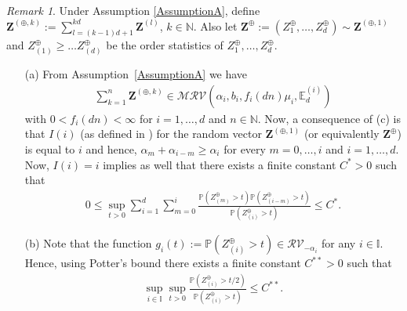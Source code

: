 \documentclass[aos]{imsart}
\numberwithin{equation}{section}
\theoremstyle{plain} %
\theoremstyle{remark}
\newtheorem{remark}[theorem]{Remark}
\newcommand{\beao}{\begin{eqnarray*}}
\newcommand{\eeao}{\end{eqnarray*}\noindent}
\newcommand{\beam}{\begin{eqnarray}}
\newcommand{\eeam}{\end{eqnarray}\noindent}
\newcommand{\E}{\mathbb{E}}
\newcommand{\N}{\mathbb{N}}
\renewcommand\P{\mathbb{P}}
\newcommand{\VF}[1]{{\color{blue} #1}}
\def\MRV{\mathcal{MRV}}
\def\bZ{\boldsymbol Z}
\newcommand{\DAS}[1]{{\color{red} #1}}
\begin{document}
 
\newpage
    
    \begin{remark} \label{Remark 2} %
    Under Assumption \ref{AssumptionA}, define $\bZ^{(\oplus,k)}:=\sum_{l=(k-1)d+1}^{kd}\bZ^{(l)}$, $k\in\N$. Also let $\bZ^{\oplus}:=(Z_{1}^{\oplus},\ldots, Z_{d}^{\oplus}) \sim \bZ^{(\oplus,1)}$ and $Z_{(1)}^{\oplus}\geq\ldots Z_{(d)}^{\oplus}$ be the order statistics of $Z_{1}^{\oplus},\ldots, Z_{d}^{\oplus}$. 
\begin{enumerate}
    \item[(a)]  From Assumption~\ref{AssumptionA} we have 
    \beao
        \sum_{k=1}^n\bZ^{(\oplus,k)}\in \MRV(\alpha_{i},b_{i},f_i(dn)\mu_i,\E_d^{(i)})
    \eeao
    with $0<f_i(dn)<\infty$ for $i=1,\ldots, d$ and $n\in\N$. Now, a consequence of  (c) is  that $I(i)$ (as defined
        in ) for the random vector $\bZ^{(\oplus,1)}$ (or equivalently $\bZ^{\oplus}$) is equal to $i$ and hence, $\alpha_m+\alpha_{i-m}\geq \alpha_i$ for every $m=0,\ldots,i$ and $i=1,\ldots,d$. 
    Now, $I(i)=i$ implies as well that there exists a finite constant $C^*>0$ such that
    \beam \label{E6}
            0\leq \sup_{t>0}\sum_{i=1}^d\sum_{m=0}^{i}\frac{\P\left(Z^{\oplus}_{(m)}>t\right)
                \P\left(Z^{\oplus}_{(i-m)}>t\right)}{\P\left(Z^{\oplus}_{(i)}>t\right)}
                \leq C^{*}.
        \eeam
    \item[(b)] %
    Note that the function
    $g_i(t):=\P\left(Z_{(i)}^{\oplus}>t\right)\in \mathcal{RV}_{-\alpha_{i}}$ for any $i\in\mathbb{I}$. %
    Hence, using Potter's bound \citep[Proposition B.1.19 (5)]{dehaan:ferreira:2006} there exists a finite constant $C^{**}>0$ such that %
        \beam \label{E7}
             \sup_{ i\in \mathbb{I} }\sup_{t>0}%
            \frac{\P\left(Z^{\oplus}_{(i)}>t/2\right)}{\P\left(Z^{\oplus}_{(i)}>t\right)}\leq C^{**}.
        \eeam  %
\end{enumerate}
\end{remark}
\end{document}

